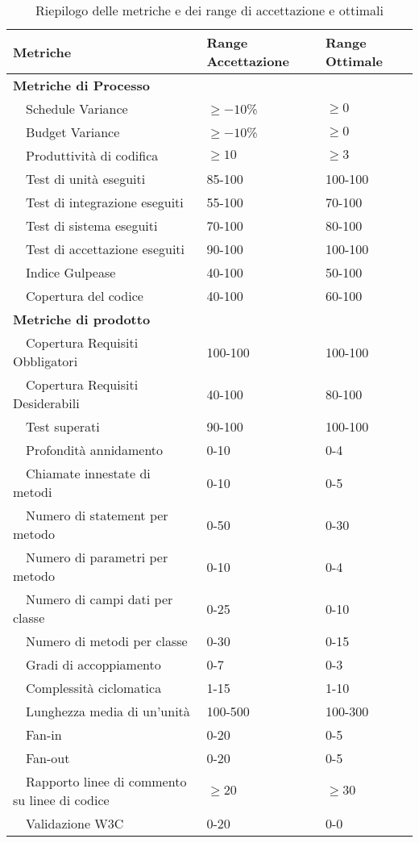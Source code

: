 	\newpage
	\begin{table}
	\begin{tabular}{|l|l|l|}
	\hline
	\textbf{Metriche} & \textbf{Range Accettazione} & \textbf{Range Ottimale} \\
	\hline
	\textbf{Metriche di Processo}&&\\
	\hline
	~~Schedule Variance &$\geq{-10}$\% &$\geq{0}$\\
	~~Budget Variance &$\geq{-10}$\% &$\geq{0}$\\
	~~Produttività di codifica &$\geq{10}$ &$\geq{3}$\\
	~~Test di unità eseguiti&85-100&100-100\\
	~~Test di integrazione eseguiti&55-100&70-100\\
	~~Test di sistema eseguiti&70-100&80-100\\
	~~Test di accettazione eseguiti&90-100&100-100\\
	~~Indice Gulpease&40-100&50-100\\
	~~Copertura del codice&40-100&60-100\\
	\hline
	\textbf{Metriche di prodotto}&&\\
	\hline
	~~Copertura Requisiti Obbligatori&100-100&100-100\\
	~~Copertura Requisiti Desiderabili&40-100&80-100\\
	~~Test superati&90-100&100-100\\
	~~Profondità annidamento&0-10&0-4\\
	~~Chiamate innestate di metodi&0-10&0-5\\
	~~Numero di statement per metodo&0-50&0-30\\
	~~Numero di parametri per metodo&0-10&0-4\\
	~~Numero di campi dati per classe&0-25&0-10\\
	~~Numero di metodi per classe&0-30&0-15\\
	~~Gradi di accoppiamento&0-7&0-3\\
	~~Complessità ciclomatica&1-15&1-10\\
	~~Lunghezza media di un'unità&100-500&100-300\\
	~~Fan-in&0-20&0-5\\
	~~Fan-out&0-20&0-5\\
	~~Rapporto linee di commento su linee di codice&$\geq{20}$&$\geq{30}$\\
	~~Validazione W3C&0-20&0-0\\
	\hline
	\end{tabular}
	\caption{Riepilogo delle metriche e dei range di accettazione e ottimali}
	\end{table}
	

